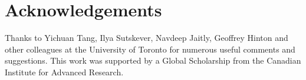 \documentclass{article}
\begin{document}
\section*{Acknowledgements}
Thanks to Yichuan Tang, Ilya Sutskever, Navdeep Jaitly, Geoffrey Hinton and other colleagues at the University of Toronto for numerous useful comments and suggestions. 
This work was supported by a Global Scholarship from the Canadian Institute for Advanced Research.


{

}
\end{document}
